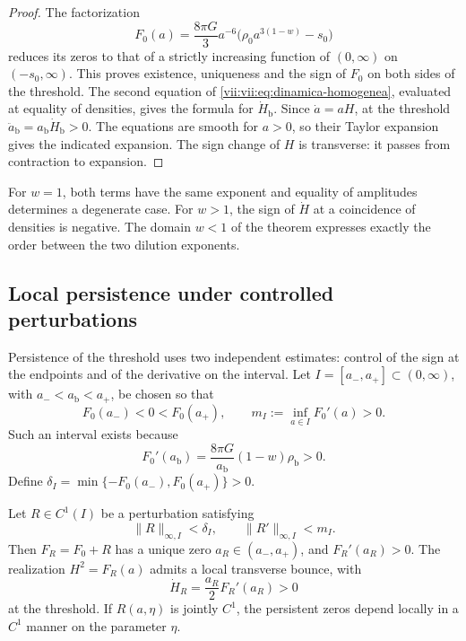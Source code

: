\begin{proof}
The factorization
\[
 F_0(a)=\frac{8\pi G}{3}a^{-6}
             \bigl(\rho_0a^{3(1-w)}-s_0\bigr)
\]
reduces its zeros to that of a strictly increasing function of
\((0,\infty)\) on \((-s_0,\infty)\). This proves existence,
uniqueness and the sign of \(F_0\) on both sides of the threshold.
The second equation of \eqref{vii:vii:eq:dinamica-homogenea}, evaluated
at equality of densities, gives the formula for \(\dot H_{\mathrm b}\).
Since \(\dot a=aH\), at the threshold
\(\ddot a_{\mathrm b}=a_{\mathrm b}\dot H_{\mathrm b}>0\).
The equations are smooth for \(a>0\), so their Taylor
expansion gives the indicated expansion. The sign change of \(H\) is
transverse: it passes from contraction to expansion.
\end{proof}

For \(w=1\), both terms have the same exponent and equality of
amplitudes determines a degenerate case. For \(w>1\), the sign of
\(\dot H\) at a coincidence of densities is negative.
The domain \(w<1\) of the theorem expresses exactly the order between the
two dilution exponents.

\subsection{Local persistence under controlled perturbations}
\label{vii:vii:sec:persistencia}

Persistence of the threshold uses two independent estimates:
control of the sign at the endpoints and of the derivative on the
interval. Let \(I=[a_-,a_+]\subset(0,\infty)\), with
\(a_-<a_{\mathrm b}<a_+\), be chosen so that
\[
 F_0(a_-)<0<F_0(a_+),\qquad
 m_I:=\inf_{a\in I}F_0'(a)>0.
\]
Such an interval exists because
\[
 F_0'(a_{\mathrm b})
   =\frac{8\pi G}{a_{\mathrm b}}(1-w)\rho_{\mathrm b}>0.
\]
Define
\(\delta_I=\min\{-F_0(a_-),F_0(a_+)\}>0\).

\begin{theorem}
\label{vii:vii:thm:persistencia}
Let \(R\in C^1(I)\) be a perturbation satisfying
\[
 \|R\|_{\infty,I}<\delta_I,\qquad
 \|R'\|_{\infty,I}<m_I.
\]
Then \(F_R=F_0+R\) has a unique zero \(a_R\in(a_-,a_+)\), and
\(F_R'(a_R)>0\). The realization \(H^2=F_R(a)\) admits a local
transverse bounce, with
\[
 \dot H_R=\frac{a_R}{2}F_R'(a_R)>0
\]
at the threshold. If \(R(a,\eta)\) is jointly \(C^1\), the persistent
zeros depend locally in a \(C^1\) manner on the parameter \(\eta\).
\end{theorem}

